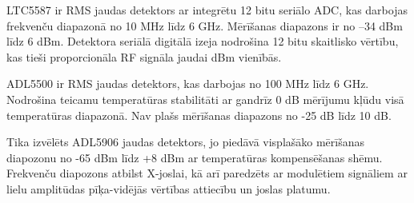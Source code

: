 LTC5587\cite{ltc5587id} ir  RMS jaudas detektors ar integrētu 12 bitu seriālo ADC, kas darbojas frekvenču diapazonā no 10 MHz līdz 6 GHz. Mērīšanas diapazons ir no –34 dBm līdz 6 dBm. Detektora seriālā digitālā izeja nodrošina 12 bitu skaitlisko vērtību, kas tieši proporcionāla RF signāla jaudai dBm vienībās.

ADL5500\cite{adl5500} ir RMS jaudas detektors, kas darbojas no 100 MHz līdz 6 GHz. Nodrošina teicamu temperatūras stabilitāti ar gandrīz 0 dB mērījumu kļūdu visā temperatūras diapazonā. Nav plašs mērīšanas diapazons no -25 dB līdz 10 dB.

Tika izvēlēts ADL5906 jaudas detektors, jo piedāvā visplašāko mērīšanas diapozonu no -65 dBm līdz +8 dBm ar temperatūras kompensēšanas shēmu. Frekvenču diapozons atbilst X-joslai, kā arī paredzēts ar modulētiem signāliem ar lielu amplitūdas pīķa-vidējās vērtības attiecību un joslas platumu.